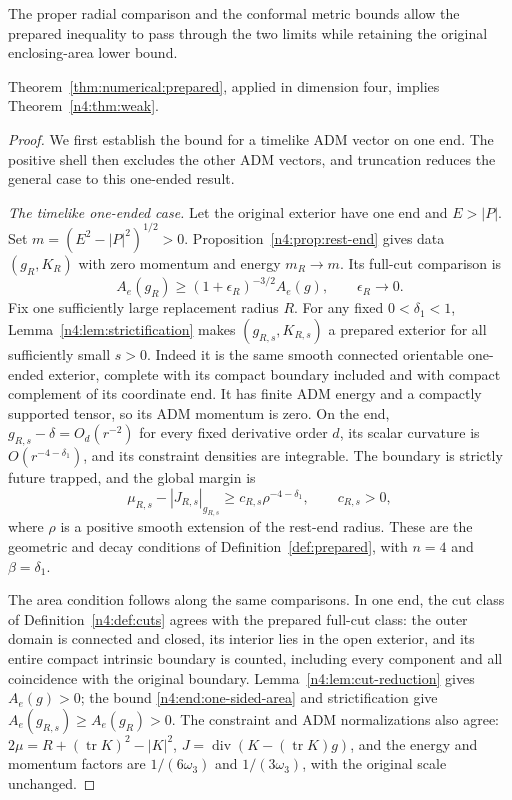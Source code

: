 The proper radial comparison and the conformal metric bounds allow the
prepared inequality to pass through the two limits while retaining the
original enclosing-area lower bound.

\begin{proposition}\label{n4:end:transfer}
Theorem~\ref{thm:numerical:prepared}, applied in dimension four,
implies Theorem~\ref{n4:thm:weak}.
\end{proposition}

\begin{proof}
We first establish the bound for a timelike ADM vector on one end.
The positive shell then excludes the other ADM vectors, and truncation
reduces the general case to this one-ended result.

\smallskip
\noindent\emph{The timelike one-ended case.} Let the original exterior have
one end and $E>|P|$.
Set $m=(E^2-|P|^2)^{1/2}>0$.
Proposition~\ref{n4:prop:rest-end} gives data $(g_R,K_R)$ with
zero momentum and energy $m_R\to m$. Its full-cut comparison is
\begin{equation}\label{n4:end:one-sided-area}
 A_e(g_R)\ge(1+\epsilon_R)^{-3/2}A_e(g),
 \qquad \epsilon_R\longrightarrow0.
\end{equation}
Fix one sufficiently large replacement radius $R$. For any fixed
$0<\delta_1<1$, Lemma~\ref{n4:lem:strictification} makes
$(g_{R,s},K_{R,s})$ a prepared exterior for all sufficiently small
$s>0$. Indeed it is the same smooth connected orientable one-ended
exterior, complete with its compact boundary included and with compact
complement of its coordinate end. It has finite ADM energy and a
compactly supported tensor, so its ADM momentum is zero. On the end,
$g_{R,s}-\delta=O_d(r^{-2})$ for every fixed derivative order $d$,
its scalar curvature is
$O(r^{-4-\delta_1})$, and its constraint densities are integrable.
The boundary is strictly future trapped, and the global margin is
\[
 \mu_{R,s}-|J_{R,s}|_{g_{R,s}}
 \ge c_{R,s}\rho^{-4-\delta_1},\qquad c_{R,s}>0,
\]
where $\rho$ is a positive smooth extension of the rest-end radius.
These are the geometric and decay conditions of
Definition~\ref{def:prepared}, with $n=4$ and $\beta=\delta_1$.

The area condition follows along the same comparisons. In one end,
the cut class of Definition~\ref{n4:def:cuts} agrees with the prepared
full-cut class:
the outer domain is connected and closed, its interior lies in the
open exterior, and its entire compact intrinsic boundary is counted,
including every component and all coincidence with the original boundary.
Lemma~\ref{n4:lem:cut-reduction} gives $A_e(g)>0$;
the bound \eqref{n4:end:one-sided-area} and strictification give
$A_e(g_{R,s})\ge A_e(g_R)>0$.
The constraint and ADM normalizations also agree:
$2\mu=R+(\operatorname{tr}K)^2-|K|^2$,
$J=\operatorname{div}(K-(\operatorname{tr}K)g)$, and the energy and
momentum factors are $1/(6\omega_3)$ and $1/(3\omega_3)$, with the
original scale unchanged.


\end{proof}
